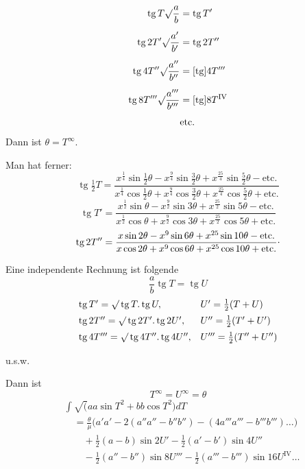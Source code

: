 \[\begin{aligned}
\operatorname{tg}T\surd\frac ab&=\operatorname{tg}T'\\[.5em]
\operatorname{tg}2T'\surd\frac{a'}{b'}&=\operatorname{tg}2T''\\[.5em]
\operatorname{tg}4T''\surd\frac{a''}{b''}&=[\operatorname{tg}]4T'''\\[.5em]
\operatorname{tg}8T'''\surd\frac{a'''}{b'''}&=[\operatorname{tg}]8T^{\mathrm{IV}}\\[.4em]
&\text{etc.}
\end{aligned}\]
\noindent Dann ist \(\theta=T^\infty.\)
\par\indent Man hat ferner:
{\small
\[\operatorname{tg}\tfrac12T=
\frac{x^{\frac14}\sin\frac12\theta-x^{\frac94}\sin\frac32\theta+x^{\frac{25}4}\sin\frac52\theta-\text{etc.}}
{x^{\frac14}\cos\frac12\theta+x^{\frac94}\cos\frac32\theta+x^{\frac{25}4}\cos\frac52\theta+\text{etc.}}\]
\[\operatorname{tg}T'=
\frac{x^{\frac12}\sin\theta-x^{\frac92}\sin3\theta+x^{\frac{25}2}\sin5\theta-\text{etc.}}
{x^{\frac12}\cos\theta+x^{\frac92}\cos3\theta+x^{\frac{25}2}\cos5\theta+\text{etc.}}\]
\[\operatorname{tg}2T''=
\frac{x\sin2\theta-x^9\sin6\theta+x^{25}\sin10\theta-\text{etc.}}
{x\cos2\theta+x^9\cos6\theta+x^{25}\cos10\theta+\text{etc.}}\mathpunct{\raisebox{.5ex}{.}}\]}
\ClosingRule
\clearpage{}
\par\indent Eine independente Rechnung ist folgende
\[\frac ab\operatorname{tg}T=\operatorname{tg}U\]
{\small
\[\begin{array}{ll}
\operatorname{tg}T'=\surd\operatorname{tg}T.\operatorname{tg}U,&U'=\tfrac12(T+U)\\[.5em]
\operatorname{tg}2T''=\surd\operatorname{tg}2T'.\operatorname{tg}2U',&U''=\tfrac12(T'+U')\\[.5em]
\operatorname{tg}4T'''=\surd\operatorname{tg}4T''.\operatorname{tg}4U'',&U'''=\tfrac12(T''+U'')
\end{array}\]}
\begin{center}u.s.w.\end{center}
\noindent Dann ist
\[T^\infty=U^\infty=\theta\]
{\small
\[\begin{aligned}
&\int\surd(aa\sin T^2+bb\cos T^2)dT\\
&\quad=\frac\theta\mu\bigl(a'a'-2(a''a''-b''b'')-(4a'''a'''-b'''b''')\ldots\bigr)\\[.5em]
&\qquad+\tfrac12(a-b)\sin2U'-\tfrac12(a'-b')\sin4U''\\[.4em]
&\qquad-\tfrac12(a''-b'')\sin8U'''-\tfrac12(a'''-b''')\sin16U^{\mathrm{IV}}\ldots
\end{aligned}\]}
